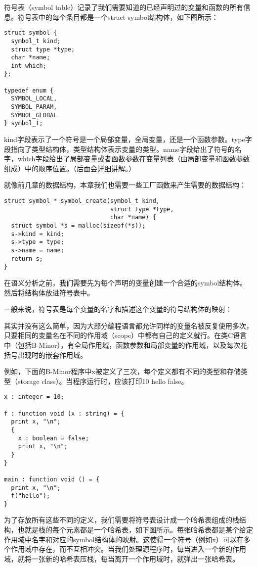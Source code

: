 \documentclass[cn,11pt,chinese]{elegantbook}
\begin{document}
符号表（symbol table）记录了我们需要知道的已经声明过的变量和函数的所有信息。符号表中的每个条目都是一个struct symbol结构体，如下图所示：

\begin{verbatim}
struct symbol {
  symbol_t kind;
  struct type *type;
  char *name;
  int which;
};

typedef enum {
  SYMBOL_LOCAL,
  SYMBOL_PARAM,
  SYMBOL_GLOBAL
} symbol_t;
\end{verbatim}

kind字段表示了一个符号是一个局部变量，全局变量，还是一个函数参数。type字段指向了类型结构体，类型结构体表示变量的类型。name字段给出了符号的名字，which字段给出了局部变量或者函数参数在变量列表（由局部变量和函数参数组成）中的顺序位置。（后面会详细讲解。）

就像前几章的数据结构，本章我们也需要一些工厂函数来产生需要的数据结构：

\begin{verbatim}
struct symbol * symbol_create(symbol_t kind,
                              struct type *type,
                              char *name) {
  struct symbol *s = malloc(sizeof(*s));
  s->kind = kind;
  s->type = type;
  s->name = name;
  return s;
}
\end{verbatim}

在语义分析之前，我们需要先为每个声明的变量创建一个合适的symbol结构体。然后将结构体放进符号表中。

一般来说，符号表是每个变量的名字和描述这个变量的符号结构体的映射：

其实并没有这么简单，因为大部分编程语言都允许同样的变量名被反复使用多次，只要相同的变量名在不同的作用域（scope）中都有自己的定义就行。在类C语言中（包括B-Minor），有全局作用域，函数参数和局部变量的作用域，以及每次花括号出现时的嵌套作用域。

例如，下面的B-Minor程序中x被定义了三次，每个定义都有不同的类型和存储类型（storage class）。当程序运行时，应该打印10 hello false。

\begin{verbatim}
x : integer = 10;

f : function void (x : string) = {
  print x, "\n";
  {
    x : boolean = false;
    print x, "\n";
  }
}

main : function void () = {
  print x, "\n";
  f("hello");
}
\end{verbatim}

为了存放所有这些不同的定义，我们需要将符号表设计成一个哈希表组成的栈结构，也就是栈的每个元素都是一个哈希表，如下图所示。每张哈希表都是某个给定作用域中名字和对应的symbol结构体的映射。这使得一个符号（例如x）可以在多个作用域中存在，而不互相冲突。当我们处理源程序时，每当进入一个新的作用域，就将一张新的哈希表压栈，每当离开一个作用域时，就弹出一张哈希表。
\end{document}
